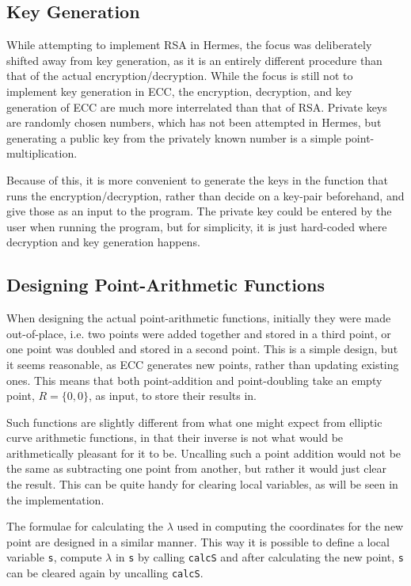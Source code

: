 \subsection{Key Generation}
While attempting to implement RSA in Hermes, the focus was deliberately shifted away from key generation, as it is an entirely different procedure than that of the actual encryption/decryption. While the focus is still not to implement key generation in ECC, the encryption, decryption, and key generation of ECC are much more interrelated than that of RSA. Private keys are randomly chosen numbers, which has not been attempted in Hermes, but generating a public key from the privately known number is a simple point-multiplication.

Because of this, it is more convenient to generate the keys in the function that runs the encryption/decryption, rather than decide on a key-pair beforehand, and give those as an input to the program. The private key could be entered by the user when running the program, but for simplicity, it is just hard-coded where decryption and key generation happens. 

\subsection{Designing Point-Arithmetic Functions}
When designing the actual point-arithmetic functions, initially they were made out-of-place, i.e. two points were added together and stored in a third point, or one point was doubled and stored in a second point. This is a simple design, but it seems reasonable, as ECC generates new points, rather than updating existing ones. This means that both point-addition and point-doubling take an empty point, $R=\{0,0\}$, as input, to store their results in. 

Such functions are slightly different from what one might expect from elliptic curve arithmetic functions, in that their inverse is not what would be arithmetically pleasant for it to be. Uncalling such a point addition would not be the same as subtracting one point from another, but rather it would just clear the result. This can be quite handy for clearing local variables, as will be seen in the implementation.

The formulae for calculating the $\lambda$ used in computing the coordinates for the new point are designed in a similar manner. This way it is possible to define a local variable \texttt{s}, compute $\lambda$ in \texttt{s} by calling \texttt{calcS} and after calculating the new point, \texttt{s} can be cleared again by uncalling \texttt{calcS}. 


